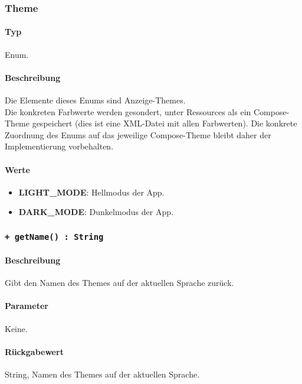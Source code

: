 \subsubsection{Theme}
\paragraph*{Typ}
Enum.
\paragraph*{Beschreibung}
Die Elemente dieses Enums sind Anzeige-Themes.\\
Die konkreten Farbwerte werden gesondert, unter Ressources als ein Compose-Theme gespeichert 
(dies ist eine XML-Datei mit allen Farbwerten). Die konkrete Zuordnung des Enums auf das jeweilige 
Compose-Theme bleibt daher der Implementierung vorbehalten.

\paragraph*{Werte}
\begin{itemize}
    \item \textbf{LIGHT\_MODE}: Hellmodus der App.
    \item \textbf{DARK\_MODE}: Dunkelmodus der App.
\end{itemize}

\subsubsection{\texttt{+ getName() : String}}%
\paragraph*{Beschreibung}
Gibt den Namen des Themes auf der aktuellen Sprache zurück.
\paragraph*{Parameter}
Keine.
\paragraph*{Rückgabewert}
String,  Namen des Themes auf der aktuellen Sprache.